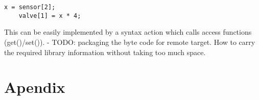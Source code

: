 \documentclass[11pt]{article} %
\begin{document}
\begin{lstlisting}[caption={Arrays},label={lst:verilog-if},language=C99,frame=single]
    x = sensor[2];
    valve[1] = x * 4;
\end{lstlisting}

This can be easily implemented by a syntax action which calls access functions (get()/set()).
- TODO: packaging the byte code for remote target. How to carry the required library information without taking too much space.

\section{Apendix}
\end{document}

